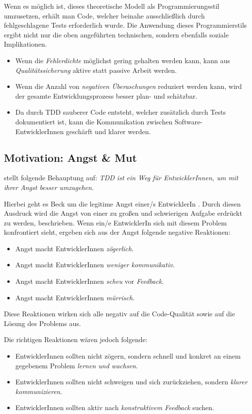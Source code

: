 Wenn es möglich ist, dieses theoretische Modell als Programmierungsstil umzusetzen, erhält man Code, welcher beinahe ausschließlich durch fehlgeschlagene Tests erforderlich wurde. Die Anwendung dieses Programmierstils ergibt nicht nur die oben angeführten technischen, sondern ebenfalls soziale Implikationen.
\begin{itemize}
  \item Wenn die \textit{Fehlerdichte} möglichst gering gehalten werden kann, kann aus \textit{Qualitätssicherung} aktive statt passive Arbeit werden.
  \item Wenn die Anzahl von \textit{negativen Überaschungen} reduziert werden kann, wird der gesamte Entwicklungsprozess besser plan- und schätzbar.
  \item Da durch TDD sauberer Code entsteht, welcher zusätzlich durch Tests dokumentiert ist, kann die Kommunikation zwischen Software-EntwicklerInnen geschärft und klarer werden.
\end{itemize}

\subsection{Motivation: Angst {\&} Mut}
\cite{Beck:2003} stellt folgende Behauptung auf: \newline
\textit{TDD ist ein Weg für EntwicklerInnen, um mit ihrer Angst besser umzugehen}.

Hierbei geht es Beck um die legitime Angst einer/s EntwicklerIn . Durch diesen Ausdruck wird die Angst von einer zu großen und schwierigen Aufgabe erdrückt zu werden, beschrieben. Wenn ein/e EntwicklerIn sich mit diesem Problem konfrontiert sieht, ergeben sich aus der Angst folgende negative Reaktionen:
\begin{itemize}
  \item Angst macht EntwicklerInnen \textit{zögerlich}.
  \item Angst macht EntwicklerInnen \textit{weniger kommunikativ}.
  \item Angst macht EntwicklerInnen \textit{scheu} vor \textit{Feedback}.
  \item Angst macht EntwicklerInnen \textit{mürrisch}.
\end{itemize}
Diese Reaktionen wirken sich alle negativ auf die Code-Qualität sowie auf die Lösung des Problems aus.

Die richtigen Reaktionen wären jedoch folgende:
\begin{itemize}
  \item EntwicklerInnen sollten nicht zögern, sondern schnell und konkret an einem gegebenem Problem \textit{lernen und wachsen}.
  \item EntwicklerInnen sollten nicht schweigen und sich zurückziehen, sondern \textit{klarer kommunizieren}.
  \item EntwicklerInnen sollten aktiv nach \textit{konstruktivem Feedback} suchen.
\end{itemize}

